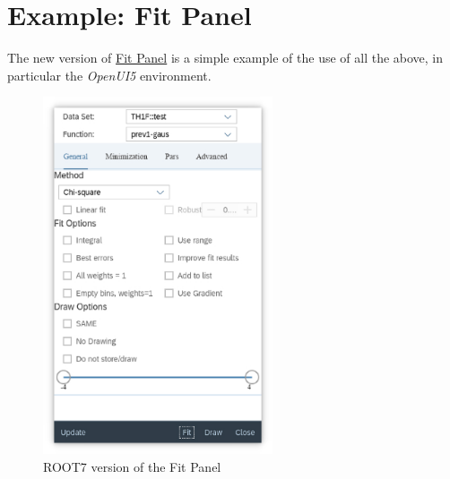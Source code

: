 \documentclass[a4paper]{jpconf}
\begin{document}
\section{Example: Fit Panel}

The new version of \href{https://root.cern.ch/fit-panel}{Fit Panel} is a simple
example of the use of all the above, in particular the \textit{OpenUI5} environment.

\begin{figure}[h]
  \centering
\begin{minipage}{14pc}
\includegraphics[width=16pc]{rfitpanel1.eps}
\caption{\label{label}ROOT7 version of the Fit Panel}
\end{minipage}\hspace{2pc}%

\end{figure}
\end{document}
